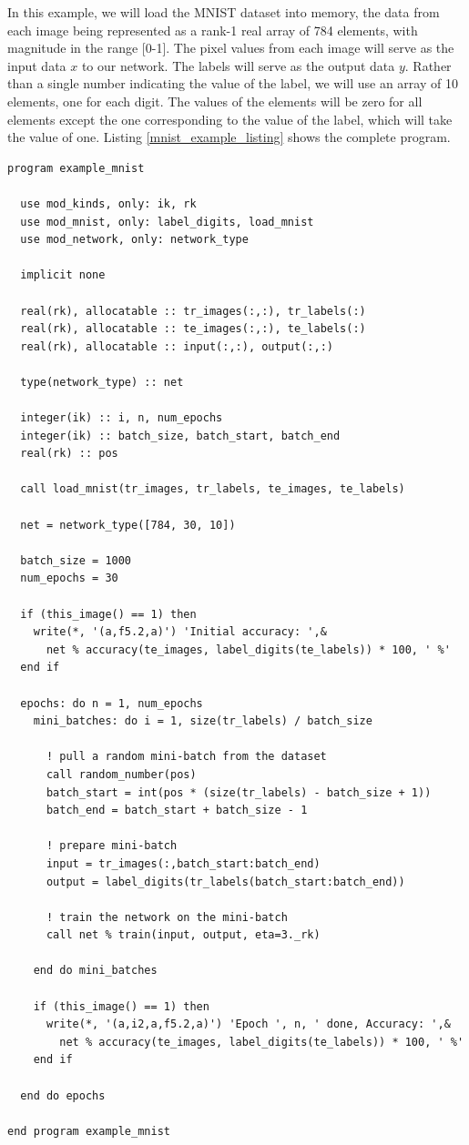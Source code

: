 \documentclass[sigplan, review=false, screen=true, balance=true]{acmart}
\begin{document}
In this example, we will load the MNIST dataset into memory, the data from
each image being represented as a rank-1 real array of 784 elements, with
magnitude in the range [0-1]. The pixel values from each image will serve as the
input data $x$ to our network. The labels will serve as the output data $y$.
Rather than a single number indicating the value of the label, we will use
an array of 10 elements, one for each digit. The values of the elements will
be zero for all elements except the one corresponding to the value of the label,
which will take the value of one.
Listing \ref{mnist_example_listing} shows the complete program.

\begin{lstlisting}[caption={The complete program to train and evaluate a neural network using the MNIST dataset of handwritten digits.}, captionpos=b, float=*, label={mnist_example_listing}]
program example_mnist

  use mod_kinds, only: ik, rk
  use mod_mnist, only: label_digits, load_mnist
  use mod_network, only: network_type

  implicit none

  real(rk), allocatable :: tr_images(:,:), tr_labels(:)
  real(rk), allocatable :: te_images(:,:), te_labels(:)
  real(rk), allocatable :: input(:,:), output(:,:)

  type(network_type) :: net

  integer(ik) :: i, n, num_epochs
  integer(ik) :: batch_size, batch_start, batch_end
  real(rk) :: pos

  call load_mnist(tr_images, tr_labels, te_images, te_labels)

  net = network_type([784, 30, 10])

  batch_size = 1000
  num_epochs = 30

  if (this_image() == 1) then
    write(*, '(a,f5.2,a)') 'Initial accuracy: ',&
      net % accuracy(te_images, label_digits(te_labels)) * 100, ' %'
  end if

  epochs: do n = 1, num_epochs
    mini_batches: do i = 1, size(tr_labels) / batch_size

      ! pull a random mini-batch from the dataset
      call random_number(pos)
      batch_start = int(pos * (size(tr_labels) - batch_size + 1))
      batch_end = batch_start + batch_size - 1

      ! prepare mini-batch
      input = tr_images(:,batch_start:batch_end)
      output = label_digits(tr_labels(batch_start:batch_end))

      ! train the network on the mini-batch
      call net % train(input, output, eta=3._rk)

    end do mini_batches

    if (this_image() == 1) then
      write(*, '(a,i2,a,f5.2,a)') 'Epoch ', n, ' done, Accuracy: ',&
        net % accuracy(te_images, label_digits(te_labels)) * 100, ' %'
    end if

  end do epochs

end program example_mnist
\end{lstlisting}
\end{document}

